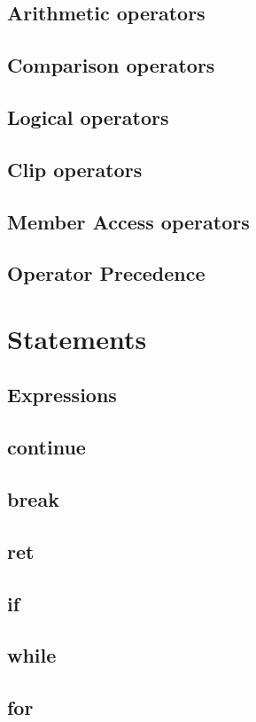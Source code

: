 \documentclass[12pt]{article}
\begin{document}
\subsection{Arithmetic operators}
\subsection{Comparison operators}
\subsection{Logical operators}
\subsection{Clip operators}
\subsection{Member Access operators}
\subsection{Operator Precedence}


\section{Statements}
\subsection{Expressions}
\subsection{continue}
\subsection{break}
\subsection{ret}
\subsection{if}
\subsection{while}
\subsection{for}
\end{document}
